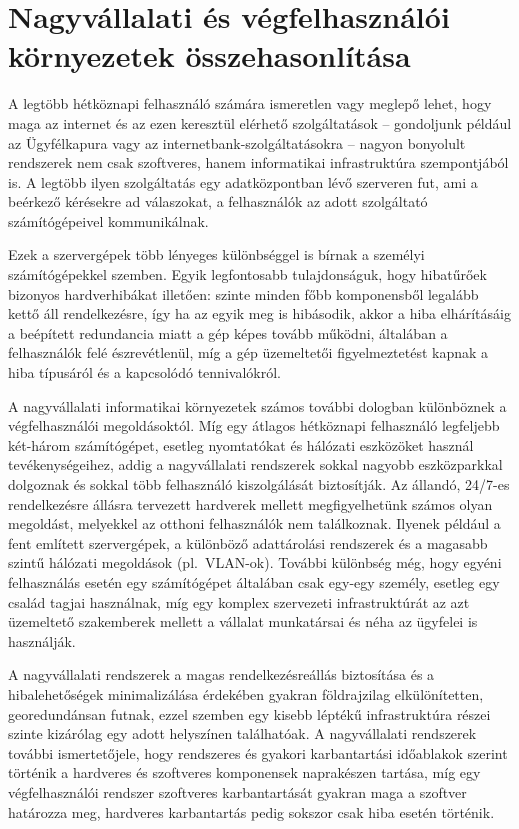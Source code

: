 \section{Nagyvállalati és végfelhasználói környezetek összehasonlítása}
A legtöbb hétköznapi felhasználó számára ismeretlen vagy meglepő lehet, hogy maga az internet és az ezen keresztül elérhető szolgáltatások -- gondoljunk például az Ügyfélkapura vagy az internetbank-szolgáltatásokra -- nagyon bonyolult rendszerek nem csak szoftveres, hanem informatikai infrastruktúra szempontjából is. A legtöbb ilyen szolgáltatás egy adatközpontban lévő szerveren fut, ami a beérkező kérésekre ad válaszokat, a felhasználók az adott szolgáltató számítógépeivel kommunikálnak.

Ezek a szervergépek több lényeges különbséggel is bírnak a személyi számítógépekkel szemben. Egyik legfontosabb tulajdonságuk, hogy hibatűrőek bizonyos hardverhibákat illetően: szinte minden főbb komponensből legalább kettő áll rendelkezésre, így ha az egyik meg is hibásodik, akkor a hiba elhárításáig a beépített redundancia miatt a gép képes tovább működni, általában a felhasználók felé észrevétlenül, míg a gép üzemeltetői figyelmeztetést kapnak a hiba típusáról és a kapcsolódó tennivalókról.

A nagyvállalati informatikai környezetek számos további dologban különböznek a végfelhasználói megoldásoktól. Míg egy átlagos hétköznapi felhasználó legfeljebb két-három számítógépet, esetleg nyomtatókat és hálózati eszközöket használ tevékenységeihez, addig a nagyvállalati rendszerek sokkal nagyobb eszközparkkal dolgoznak és sokkal több felhasználó kiszolgálását biztosítják. Az állandó, 24/7-es rendelkezésre állásra tervezett hardverek mellett megfigyelhetünk számos olyan megoldást, melyekkel az otthoni felhasználók nem találkoznak. Ilyenek például a fent említett szervergépek, a különböző adattárolási rendszerek és a magasabb szintű hálózati megoldások (pl.~VLAN-ok). További különbség még, hogy egyéni felhasználás esetén egy számítógépet általában csak egy-egy személy, esetleg egy család tagjai használnak, míg egy komplex szervezeti infrastruktúrát az azt üzemeltető szakemberek mellett a vállalat munkatársai és néha az ügyfelei is használják.

A nagyvállalati rendszerek a magas rendelkezésreállás biztosítása és a hibalehetőségek minimalizálása érdekében gyakran földrajzilag elkülönítetten, georedundánsan futnak, ezzel szemben egy kisebb léptékű infrastruktúra részei szinte kizárólag egy adott helyszínen találhatóak. A nagyvállalati rendszerek további ismertetőjele, hogy rendszeres és gyakori karbantartási időablakok szerint történik a hardveres és szoftveres komponensek naprakészen tartása, míg egy végfelhasználói rendszer szoftveres karbantartását gyakran maga a szoftver határozza meg, hardveres karbantartás pedig sokszor csak hiba esetén történik.

